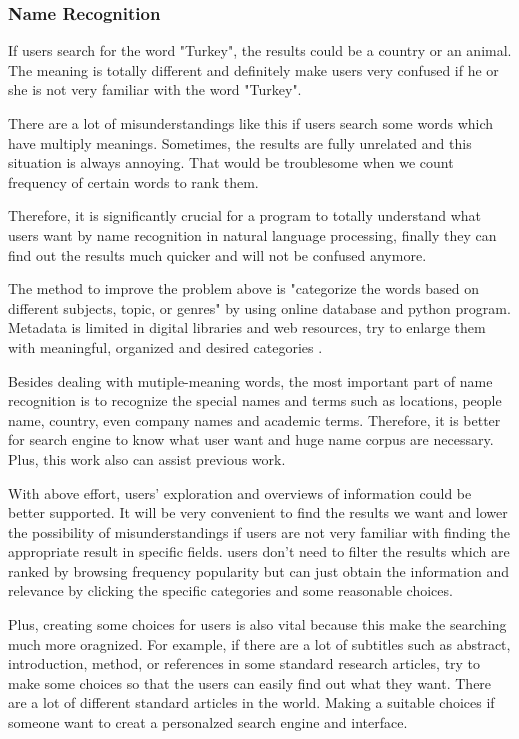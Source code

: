 \subsubsection*{Name Recognition}

If users search for the word "Turkey", the results could be a country or an animal. 
The meaning is totally different and definitely make users very confused if he or she is not very familiar with the word "Turkey". 

There are a lot of misunderstandings like this if users search some words which have multiply meanings. 
Sometimes, the results are fully unrelated and this situation is always annoying. 
That would be troublesome when we count frequency of certain words to rank them.

Therefore, it is significantly crucial for a program to totally understand what users want by name recognition in natural language processing, finally they can find out the results much quicker and will not be confused anymore.

The method to improve the problem above is "categorize the words based on different subjects, topic, or genres" by using online database and python program. 
Metadata is limited in digital libraries and web resources, try to enlarge them with meaningful, organized and desired categories \cite{Kules2006}.

Besides dealing with mutiple-meaning words, the most important part of name recognition is to recognize the special names and terms such as locations, people name, country, even company names and academic terms.
Therefore, it is better for search engine to know what user want and huge name corpus are necessary. 
Plus, this work also can assist previous work.

With above effort, users' exploration and overviews of information could be better supported. It will be very convenient to find the results we want and lower the possibility of misunderstandings if users are not very familiar with finding the appropriate result in specific fields.
\cite{TunThuraThet2010} users don't need to filter the results which are ranked by browsing frequency popularity but can just obtain the information and relevance by clicking the specific categories and some reasonable choices.

Plus, creating some choices for users is also vital because this make the searching much more oragnized. 
For example, if there are a lot of subtitles such as abstract, introduction, method, or references in some standard research articles, try to make some choices so that the users can easily find out what they want. 
There are a lot of different standard articles in the world.
 Making a suitable choices if someone want to creat a personalzed search engine and interface. 

